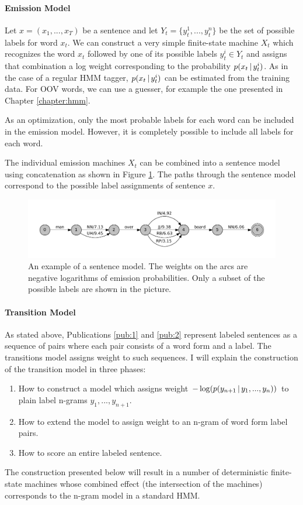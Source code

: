 \paragraph{Emission Model} Let $x = (x_1, ..., x_T)$ be a sentence and
let $Y_t = \{y_t^1, ..., y_t^n\}$ be the set of possible labels for
word $x_t$. We can construct a very simple finite-state machine
$X_t$ which recognizes the word $x_t$ followed by one of its possible labels
$y_t^i \in Y_t$ and assigns that combination a log weight corresponding
to the probability $p(x_t\mbox{$ \, | \, $} y_t^i)$. As in the case of a regular HMM tagger,
$p(x_t\mbox{$ \, | \, $} y_t^i)$ can be estimated from the training data. For OOV words,
we can use a guesser, for example the one presented in Chapter
\ref{chapter:hmm}.

As an optimization, only the most probable labels for each word can be
included in the emission model. However, it is completely possible to
include all labels for each word.

The individual emission machines $X_t$ can be combined into a sentence
model using concatenation as shown in Figure
\ref{fig:sentence-model}. The paths through the sentence model
correspond to the possible label assignments of sentence $x$.

\begin{figure}[!htb]
\includegraphics[scale=0.49]{sentence_model}
\caption{An example of a sentence model. The weights on the arcs are
  negative logarithms of emission probabilities. Only a subset of the
  possible labels are shown in the picture.}\label{fig:sentence-model}
\end{figure}

\paragraph{Transition Model} As stated above, Publications \ref{pub:1}
and \ref{pub:2} represent labeled sentences as a sequence of pairs
where each pair consists of a word form and a label. The transitions
model assigns weight to such sequences. I will explain the
construction of the transition model in three phases:
\begin{enumerate}
\item How to construct a model which assigns weight $-\log(p(y_{n+1}\mbox{$ \, | \, $}
y_{1}, ..., y_{n}))$ to plain label n-grams $y_1, ..., y_{n+1}$.
\item How to extend the model to assign weight to an n-gram of word form label pairs.
\item How to score an entire labeled sentence.
\end{enumerate}
The construction presented below will result in a number of
deterministic finite-state machines whose combined effect (the
intersection of the machines) corresponds to the n-gram model in a
standard HMM.

